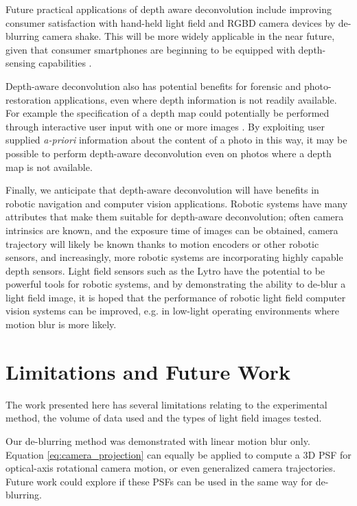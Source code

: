 Future practical applications of depth aware deconvolution include improving consumer satisfaction with hand-held light field and RGBD camera devices by de-blurring camera shake.
This will be more widely applicable in the near future, given that consumer smartphones are beginning to be equipped with depth-sensing capabilities \cite{google2014lensblur, google2014tango}.

Depth-aware deconvolution also has potential benefits for forensic and photo-restoration applications, even where depth information is not readily available.
For example the specification of a depth map could potentially be performed through interactive user input with one or more images \cite{sinha2008interactive}.
By exploiting user supplied \emph{a-priori} information about the content of a photo in this way, it may be possible to perform depth-aware deconvolution even on photos where a depth map is not available. 

Finally, we anticipate that depth-aware deconvolution will have benefits in robotic navigation and computer vision applications.
Robotic systems have many attributes that make them suitable for depth-aware deconvolution; often camera intrinsics are known, and the exposure time of images can be obtained, camera trajectory will likely be known thanks to motion encoders or other robotic sensors, and increasingly, more robotic systems are incorporating highly capable depth sensors.
Light field sensors such as the Lytro have the potential to be powerful tools for robotic systems, and by demonstrating the ability to de-blur a light field image, it is hoped that the performance of robotic light field computer vision systems can be improved, e.g. in low-light operating environments where motion blur is more likely.


\section{Limitations and Future Work}
\label{sec:limitations_and_future_work}

The work presented here has several limitations relating to the experimental method, the volume of data used and the types of light field images tested.

Our de-blurring method was demonstrated with linear motion blur only.
Equation \ref{eq:camera_projection} can equally be applied to compute a 3D PSF for optical-axis rotational camera motion, or even generalized camera trajectories.
Future work could explore if these PSFs can be used in the same way for de-blurring.

